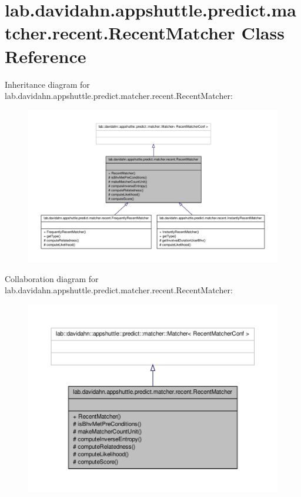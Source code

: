 \hypertarget{classlab_1_1davidahn_1_1appshuttle_1_1predict_1_1matcher_1_1recent_1_1_recent_matcher}{\section{lab.\-davidahn.\-appshuttle.\-predict.\-matcher.\-recent.\-Recent\-Matcher \-Class \-Reference}
\label{classlab_1_1davidahn_1_1appshuttle_1_1predict_1_1matcher_1_1recent_1_1_recent_matcher}
}


\-Inheritance diagram for lab.\-davidahn.\-appshuttle.\-predict.\-matcher.\-recent.\-Recent\-Matcher\-:
\nopagebreak
\begin{figure}[H]
\begin{center}
\leavevmode
\includegraphics[width=350pt]{classlab_1_1davidahn_1_1appshuttle_1_1predict_1_1matcher_1_1recent_1_1_recent_matcher__inherit__graph}
\end{center}
\end{figure}


\-Collaboration diagram for lab.\-davidahn.\-appshuttle.\-predict.\-matcher.\-recent.\-Recent\-Matcher\-:
\nopagebreak
\begin{figure}[H]
\begin{center}
\leavevmode
\includegraphics[width=350pt]{classlab_1_1davidahn_1_1appshuttle_1_1predict_1_1matcher_1_1recent_1_1_recent_matcher__coll__graph}
\end{center}
\end{figure}
